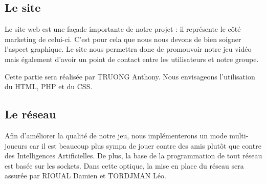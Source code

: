 \documentclass[A4paper,11pt]{article}
\begin{document}
\subsection{Le site}
Le site web est une façade importante de notre projet : il repr\'esente le c\^ot\'e marketing de celui-ci. C'est pour cela que nous nous devons de bien soigner l'aspect graphique. Le site nous permettra donc de promouvoir notre jeu vid\'eo mais \'egalement d'avoir un point de contact entre les utilisateurs et notre groupe.

Cette partie sera r\'ealis\'ee par TRUONG Anthony. Nous envisageons l'utilisation du HTML, PHP et du CSS.
\subsection{Le r\'eseau}
Afin d'am\'eliorer la qualit\'e de notre jeu, nous impl\'ementerons un mode multi-joueurs car il est beaucoup plus sympa de jouer contre des amis plut\^ot que contre des Intelligences Artificielles. De plus, la base de la programmation de tout r\'eseau est bas\'ee sur les sockets.
Dans cette optique, la mise en place du r\'eseau sera assur\'ee par RIOUAL Damien et TORDJMAN L\'eo.
\end{document}
